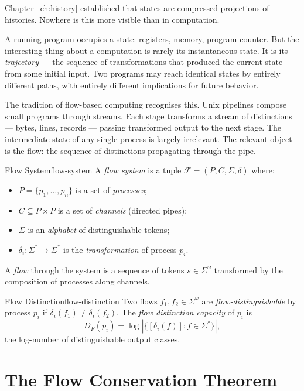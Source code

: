 \documentclass[12pt,twoside,openright]{book}
\begin{document}
Chapter~\ref{ch:history} established that states are
compressed projections of histories. Nowhere is this
more visible than in computation.

A running program occupies a state: registers, memory,
program counter. But the interesting thing about a
computation is rarely its instantaneous state. It is its
\emph{trajectory} — the sequence of transformations that
produced the current state from some initial input. Two
programs may reach identical states by entirely different
paths, with entirely different implications for future
behavior.

The tradition of flow-based computing recognises this.
Unix pipelines compose small programs through streams.
Each stage transforms a stream of distinctions — bytes,
lines, records — passing transformed output to the next
stage. The intermediate state of any single process is
largely irrelevant. The relevant object is the flow: the
sequence of distinctions propagating through the pipe.

\begin{definition}{Flow System}{flow-system}
  A \emph{flow system} is a tuple
  $\mathcal{F} = (P, C, \Sigma, \delta)$ where:
  \begin{itemize}[nosep]
    \item $P = \{p_1, \ldots, p_n\}$ is a set of
          \emph{processes};
    \item $C \subseteq P \times P$ is a set of
          \emph{channels} (directed pipes);
    \item $\Sigma$ is an \emph{alphabet} of distinguishable
          tokens;
    \item $\delta_i : \Sigma^* \to \Sigma^*$ is the
          \emph{transformation} of process $p_i$.
  \end{itemize}
  A \emph{flow} through the system is a sequence of tokens
  $s \in \Sigma^\omega$ transformed by the composition of
  processes along channels.
\end{definition}

\begin{definition}{Flow Distinction}{flow-distinction}
  Two flows $f_1, f_2 \in \Sigma^\omega$ are
  \emph{flow-distinguishable} by process $p_i$ if
  $\delta_i(f_1) \ne \delta_i(f_2)$.
  The \emph{flow distinction capacity} of $p_i$ is
  \[
    D_F(p_i) = \log|\{[\delta_i(f)] : f \in \Sigma^*\}|,
  \]
  the log-number of distinguishable output classes.
\end{definition}

\section{The Flow Conservation Theorem}
\end{document}
